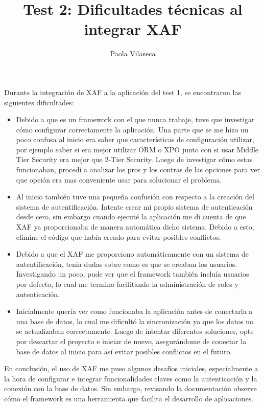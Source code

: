 \documentclass{article}
\title{Test 2: Dificultades técnicas al integrar XAF}
\author{Paola Vilaseca}
\begin{document}
\maketitle

Durante la integración de XAF a la aplicación del test 1, se encontraron las siguientes dificultades: 

\begin{itemize}
    \item Debido a que es un framework con el que nunca trabaje, tuve que investigar cómo configurar correctamente la aplicación. Una parte que se me hizo un poco confusa al inicio era saber que características de configuración utilizar, por ejemplo saber si era mejor utilizar ORM o XPO junto con si usar Middle Tier Security era mejor que 2-Tier Security. Luego de investigar cómo estas funcionaban, procedí a analizar los pros y los contras de las opciones para ver que opción era mas conveniente usar para solucionar el problema.  
    \item Al inicio también tuve una pequeña confusión con respecto a la creación del sistema de autentificación. Intente crear mi propio sistema de autenticación desde cero, sin embargo cuando ejecuté la aplicación me di cuenta de que XAF ya proporcionaba de manera automática dicho sistema. Debido a esto, elimine el código que había creado para evitar posibles conflictos.
    \item Debido a que el XAF me proporciono automáticamente con un sistema de autentificación, tenia dudas sobre como es que se creaban los usuarios. Investigando un poco, pude ver que el framework también incluía usuarios por defecto, lo cual me termino facilitando la administración de roles y autenticación. 
    \item Inicialmente quería ver como funcionaba la aplicación antes de conectarla a una base de datos, lo cual me dificultó la sincronización ya que los datos no se actualizaban correctamente. Luego de intentar diferentes soluciones, opte por descartar el proyecto e iniciar de nuevo, asegurándome de conectar la base de datos al inicio para así evitar posibles conflictos en el futuro. 
\end{itemize}

En conclusión, el uso de XAF me puso algunos desafíos iniciales, especialmente a la hora de configurar e integrar funcionalidades claves como la autenticación y la conexión con la base de datos. Sin embargo, revisando la documentación observe cómo el framework es una herramienta que facilita el desarrollo de aplicaciones.
\end{document}
